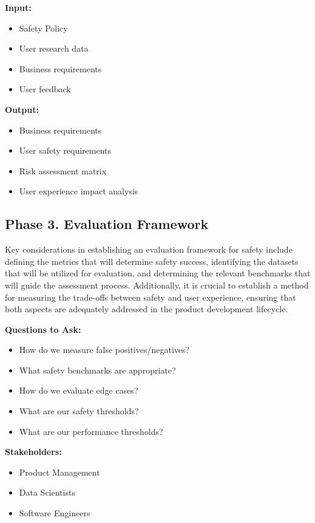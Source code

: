 \textbf{Input:}
\begin{itemize}
    \item Safety Policy
    \item User research data
    \item Business requirements
    \item User feedback
\end{itemize}

\textbf{Output:}
\begin{itemize}
    \item Business requirements
    \item User safety requirements
    \item Risk assessment matrix
    \item User experience impact analysis
\end{itemize}

\subsection{Phase 3. Evaluation Framework}

Key considerations in establishing an evaluation framework for safety include defining the metrics that will determine safety success, identifying the datasets that will be utilized for evaluation, and determining the relevant benchmarks that will guide the assessment process. Additionally, it is crucial to establish a method for measuring the trade-offs between safety and user experience, ensuring that both aspects are adequately addressed in the product development lifecycle.

\textbf{Questions to Ask:}
\begin{itemize}
    \item How do we measure false positives/negatives?
    \item What safety benchmarks are appropriate?
    \item How do we evaluate edge cases?
    \item What are our safety thresholds?
    \item What are our performance thresholds?
\end{itemize}

\textbf{Stakeholders:}
\begin{itemize}
    \item Product Management
    \item Data Scientists
    \item Software Engineers
\end{itemize}

